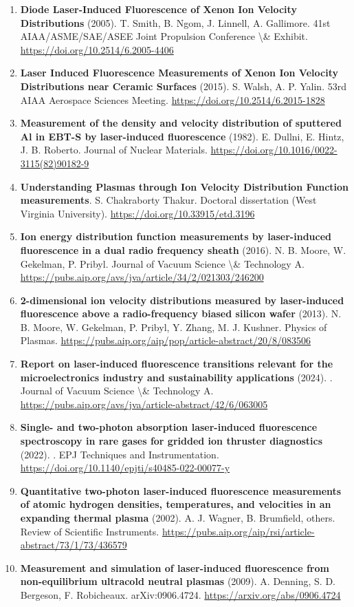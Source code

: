 \documentclass[11pt,a4paper]{article}
\begin{document}
\begin{enumerate}[leftmargin=1.4em]
\item \textbf{Diode Laser-Induced Fluorescence of Xenon Ion Velocity Distributions} (2005). T. Smith, B. Ngom, J. Linnell, A. Gallimore. 41st AIAA/ASME/SAE/ASEE Joint Propulsion Conference \textbackslash{}\& Exhibit. \url{https://doi.org/10.2514/6.2005-4406}
\item \textbf{Laser Induced Fluorescence Measurements of Xenon Ion Velocity Distributions near Ceramic Surfaces} (2015). S. Walsh, A. P. Yalin. 53rd AIAA Aerospace Sciences Meeting. \url{https://doi.org/10.2514/6.2015-1828}
\item \textbf{Measurement of the density and velocity distribution of sputtered Al in EBT-S by laser-induced fluorescence} (1982). E. Dullni, E. Hintz, J. B. Roberto. Journal of Nuclear Materials. \url{https://doi.org/10.1016/0022-3115(82)90182-9}
\item \textbf{Understanding Plasmas through Ion Velocity Distribution Function measurements}. S. Chakraborty Thakur. Doctoral dissertation (West Virginia University). \url{https://doi.org/10.33915/etd.3196}
\item \textbf{Ion energy distribution function measurements by laser-induced fluorescence in a dual radio frequency sheath} (2016). N. B. Moore, W. Gekelman, P. Pribyl. Journal of Vacuum Science \textbackslash{}\& Technology A. \url{https://pubs.aip.org/avs/jva/article/34/2/021303/246200}
\item \textbf{2-dimensional ion velocity distributions measured by laser-induced fluorescence above a radio-frequency biased silicon wafer} (2013). N. B. Moore, W. Gekelman, P. Pribyl, Y. Zhang, M. J. Kushner. Physics of Plasmas. \url{https://pubs.aip.org/aip/pop/article-abstract/20/8/083506}
\item \textbf{Report on laser-induced fluorescence transitions relevant for the microelectronics industry and sustainability applications} (2024). . Journal of Vacuum Science \textbackslash{}\& Technology A. \url{https://pubs.aip.org/avs/jva/article-abstract/42/6/063005}
\item \textbf{Single- and two-photon absorption laser-induced fluorescence spectroscopy in rare gases for gridded ion thruster diagnostics} (2022). . EPJ Techniques and Instrumentation. \url{https://doi.org/10.1140/epjti/s40485-022-00077-y}
\item \textbf{Quantitative two-photon laser-induced fluorescence measurements of atomic hydrogen densities, temperatures, and velocities in an expanding thermal plasma} (2002). A. J. Wagner, B. Brumfield, others. Review of Scientific Instruments. \url{https://pubs.aip.org/aip/rsi/article-abstract/73/1/73/436579}
\item \textbf{Measurement and simulation of laser-induced fluorescence from non-equilibrium ultracold neutral plasmas} (2009). A. Denning, S. D. Bergeson, F. Robicheaux. arXiv:0906.4724. \url{https://arxiv.org/abs/0906.4724}
\end{enumerate}
\end{document}

